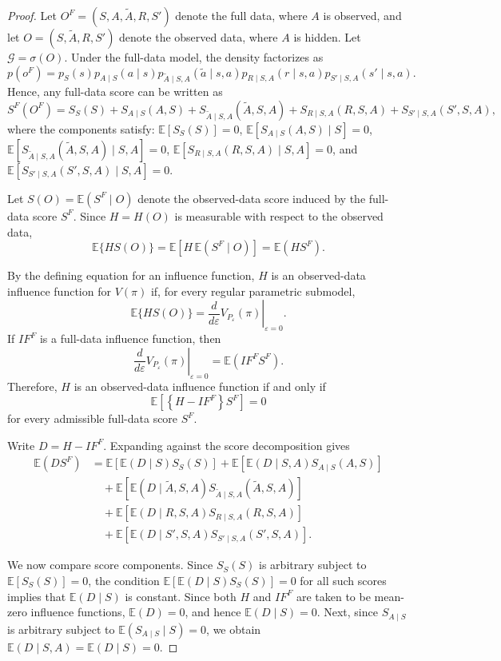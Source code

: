 \documentclass[12pt]{article}
\newcommand{\0}{\boldsymbol{0}}
\begin{document}
\begin{proof}
Let \(O^F=(S,A,\widetilde A,R,S')\) denote the full data, where \(A\) is observed, and let \(O=(S,\widetilde A,R,S')\) denote the observed data, where \(A\) is hidden. Let \(\mathcal G=\sigma(O)\). Under the full-data model, the density factorizes as
\[
p(o^F)=
p_S(s)p_{A\mid S}(a\mid s)
p_{\widetilde A\mid S,A}(\widetilde a\mid s,a)
p_{R\mid S,A}(r\mid s,a)
p_{S'\mid S,A}(s'\mid s,a).
\]
Hence, any full-data score can be written as
\[
S^F(O^F)=S_S(S)+S_{A\mid S}(A,S)+S_{\widetilde A\mid S,A}(\widetilde A,S,A)
+S_{R\mid S,A}(R,S,A)+S_{S'\mid S,A}(S',S,A),
\]
where the components satisfy:
\(\mathbb E[S_S(S)]=0\),
\(\mathbb E[S_{A\mid S}(A,S)\mid S]=0\),
\(\mathbb E[S_{\widetilde A\mid S,A}(\widetilde A,S,A)\mid S,A]=0\),
\(\mathbb E[S_{R\mid S,A}(R,S,A)\mid S,A]=0\), and
\(\mathbb E[S_{S'\mid S,A}(S',S,A)\mid S,A]=0\).

Let \(S(O)=\mathbb{E}\!\left(S^F\mid O\right)\) denote the observed-data score induced by the full-data score \(S^F\). Since \(H=H(O)\) is measurable with respect to the observed data,
\[
\mathbb{E}\{H S(O)\}=\mathbb{E}\!\left[H\,\mathbb{E}(S^F\mid O)\right]
=\mathbb{E}(H S^F).
\]

By the defining equation for an influence function, \(H\) is an observed-data influence function for \(V(\pi)\) if, for every regular parametric submodel,
\[
\mathbb{E}\{H S(O)\}=\left.\frac{d}{d\varepsilon}V_{P_\varepsilon}(\pi)\right|_{\varepsilon=0}.
\]
If \(IF^F\) is a full-data influence function, then
\[
\left.\frac{d}{d\varepsilon}V_{P_\varepsilon}(\pi)
\right|_{\varepsilon=0}=\mathbb{E}(IF^F S^F).
\]
Therefore, \(H\) is an observed-data influence function if and only if
\[
\mathbb{E}\left[\left\{H-IF^F\right\}S^F\right]=0
\]
for every admissible full-data score \(S^F\).


Write \(D=H-IF^F\). Expanding against the score decomposition gives
\[
\begin{aligned}
\mathbb E(DS^F)
&=\mathbb E[\mathbb E(D\mid S)S_S(S)]+\mathbb E[\mathbb E(D\mid S,A)S_{A\mid S}(A,S)]\\
&\quad+\mathbb E[\mathbb E(D\mid \widetilde A,S,A)S_{\widetilde A\mid S,A}(\widetilde A,S,A)]\\
&\quad+\mathbb E[\mathbb E(D\mid R,S,A)S_{R\mid S,A}(R,S,A)]\\
&\quad+\mathbb E[\mathbb E(D\mid S',S,A)S_{S'\mid S,A}(S',S,A)].
\end{aligned}
\]

We now compare score components. Since \(S_S(S)\) is arbitrary subject to \(\mathbb E[S_S(S)]=0\), the condition \(\mathbb E[\mathbb E(D\mid S)S_S(S)]=0\) for all such scores implies that \(\mathbb E(D\mid S)\) is constant. Since both \(H\) and \(IF^F\) are taken to be mean-zero influence functions, \(\mathbb E(D)=0\), and hence \(\mathbb E(D\mid S)=0\). Next, since \(S_{A\mid S}\) is arbitrary subject to \(\mathbb E(S_{A\mid S}\mid S)=0\), we obtain \(\mathbb E(D\mid S,A)=\mathbb E(D\mid S)=0\).


\end{proof}
\end{document}
